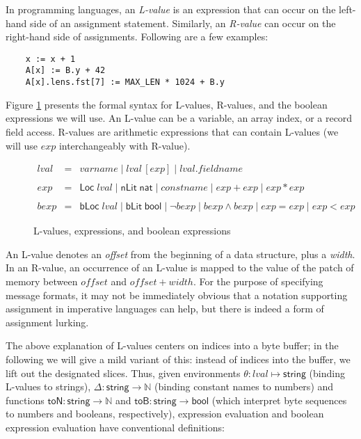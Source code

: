 \documentclass[a4paper,UKenglish,cleveref, autoref, thm-restate]{lipics-v2021}
\newcommand{\konst}[1]{\ensuremath{\mathsf{#1}}}
\begin{document}
In programming languages, an \emph{L-value} is an expression that can
occur on the left-hand side of an assignment statement. Similarly, an
\emph{R-value} can occur on the right-hand side of
assignments. Following are a few examples:
{\small
\begin{verbatim}
    x := x + 1
    A[x] := B.y + 42
    A[x].lens.fst[7] := MAX_LEN * 1024 + B.y
\end{verbatim}
}
Figure \ref{Lvalues} presents the formal syntax for L-values, R-values,
and the boolean expressions we will use.  An L-value can be
a variable, an array index, or a record field access. R-values are
arithmetic expressions that can contain L-values (we will use
$\mathit{exp}$ interchangeably with R-value).

\begin{figure}
\[
\begin{array}{rcl}
\mathit{lval} & = & \mathit{varname} \mid
                    \mathit{lval} \, [ \mathit{exp} ] \mid
                    \mathit{lval} . \mathit{fieldname} \\
  & & \\
\mathit{exp} & = & \konst{Loc}\; \mathit{lval}
              \mid \konst{nLit}\; \konst{nat}
              \mid \mathit{constname}
              \mid \mathit{exp} + \mathit{exp}
              \mid \mathit{exp} * \mathit{exp} \\
  & & \\
\mathit{bexp} & = & \konst{bLoc}\; \mathit{lval}
              \mid  \konst{bLit}\; \konst{bool}
              \mid  \neg \mathit{bexp}
              \mid  \mathit{bexp} \land \mathit{bexp}
              \mid  \mathit{exp} = \mathit{exp}
              \mid  \mathit{exp} < \mathit{exp}
\end{array}
\]
\caption{L-values, expressions, and boolean expressions}
\label{Lvalues}
\end{figure}

An L-value denotes an \emph{offset} from the beginning of a
data structure, plus a \emph{width}. In an R-value, an occurrence of an
L-value is mapped to the value of the patch of memory between
$\mathit{offset}$ and $\mathit{offset} + \mathit{width}$. For the
purpose of specifying message formats, it may not be immediately
obvious that a notation supporting assignment in imperative languages
can help, but there is indeed a form of assignment lurking.

The above explanation of L-values centers on indices into a byte
buffer; in the following we will give a mild variant of this: instead
of indices into the buffer, we lift out the designated slices. Thus,
given environments $\theta: \mathit{lval} \mapsto \konst{string}$ (binding
L-values to strings), $\Delta : \konst{string} \to \mathbb{N}$
(binding constant names to numbers) and functions
$\konst{toN}:\konst{string}\to\mathbb{N}$ and
$\konst{toB}:\konst{string}\to\konst{bool}$ (which interpret byte
sequences to numbers and booleans, respectively), expression
evaluation and boolean expression evaluation have conventional
definitions:
\end{document}
